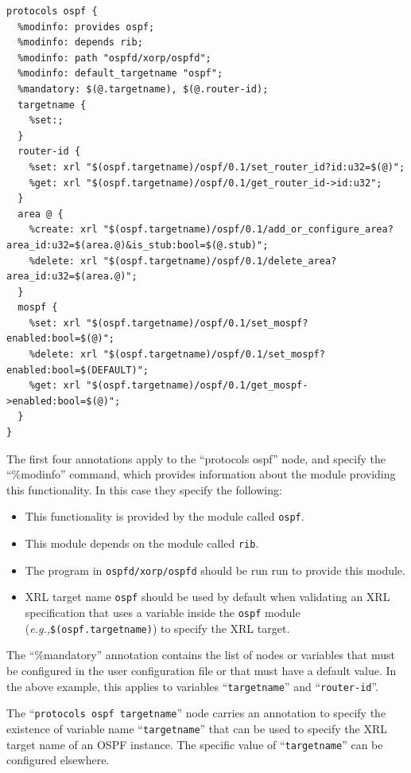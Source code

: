 \documentclass[11pt]{article}
\newcommand{\eg}{\emph{e.g.,}\xspace}
\begin{document}
\begin{verbatim}
protocols ospf {
  %modinfo: provides ospf;
  %modinfo: depends rib;
  %modinfo: path "ospfd/xorp/ospfd";
  %modinfo: default_targetname "ospf";
  %mandatory: $(@.targetname), $(@.router-id);
  targetname {
    %set:;
  }
  router-id {
    %set: xrl "$(ospf.targetname)/ospf/0.1/set_router_id?id:u32=$(@)";
    %get: xrl "$(ospf.targetname)/ospf/0.1/get_router_id->id:u32";
  }
  area @ {
    %create: xrl "$(ospf.targetname)/ospf/0.1/add_or_configure_area?area_id:u32=$(area.@)&is_stub:bool=$(@.stub)";
    %delete: xrl "$(ospf.targetname)/ospf/0.1/delete_area?area_id:u32=$(area.@)";
  }
  mospf {
    %set: xrl "$(ospf.targetname)/ospf/0.1/set_mospf?enabled:bool=$(@)";
    %delete: xrl "$(ospf.targetname)/ospf/0.1/set_mospf?enabled:bool=$(DEFAULT)";
    %get: xrl "$(ospf.targetname)/ospf/0.1/get_mospf->enabled:bool=$(@)";
  }
}
\end{verbatim}

The first four annotations apply to the ``protocols ospf'' node, and
specify the ``\%modinfo'' command, which provides information about
the module providing this functionality.  In this case they specify
the following:

\begin{itemize}

  \item This functionality is provided by the module called {\tt ospf}.

  \item This module depends on the module called {\tt rib}.

  \item The program in {\tt ospfd/xorp/ospfd} should be run run to
  provide this module.

  \item XRL target name {\tt ospf} should be used by default when validating
  an XRL specification that uses a variable inside the {\tt ospf} module
  (\eg {\tt \$(ospf.targetname)}) to specify the XRL target.

\end{itemize}

The ``\%mandatory'' annotation contains the list of nodes or variables
that must be configured in the user configuration file or that must
have a default value. In the above example, this applies to variables
``{\tt targetname}'' and ``{\tt router-id}''.

The ``{\tt protocols ospf targetname}'' node carries an annotation to
specify the existence of variable name ``{\tt targetname}'' that
can be used to specify the XRL target name of an OSPF instance.
The specific value of ``{\tt targetname}'' can be configured elsewhere.
\end{document}
